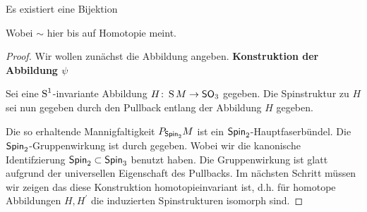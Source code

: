 \begin{Satz}
	Es existiert eine Bijektion
	\begin{center}
	\end{center}
	Wobei $ \sim $ hier bis auf Homotopie meint.
	\begin{proof}

		Wir wollen zunächst die Abbildung angeben.
          \textbf{Konstruktion der Abbildung $\psi$}
		
          Sei eine $\S^1$-invariante Abbildung
          $\abb{H}{\S M}{\so_3}$ gegeben. Die Spinstruktur zu $ H $
          sei nun gegeben durch den Pullback entlang der Abbildung $ H $
          gegeben.
              \begin{center}
            \end{center}
          Die so erhaltende Mannigfaltigkeit $ \Ph{\spin_2}{M} $ ist ein
          $ \spin_2 $-Hauptfaserbündel. Die $ \spin_2 $-Gruppenwirkung
          ist durch
          gegeben. Wobei wir die kanonische Identifzierung $ \spin_2\subset\spin_3 $ benutzt haben. Die Gruppenwirkung ist
          glatt aufgrund der universellen Eigenschaft des Pullbacks.
	       Im nächsten Schritt müssen wir zeigen das diese Konstruktion
	        homotopieinvariant ist, d.h. für homotope Abbildungen $ H,H^{'} $ die induzierten Spinstrukturen isomorph sind.
	        

\end{proof}
\end{Satz}

